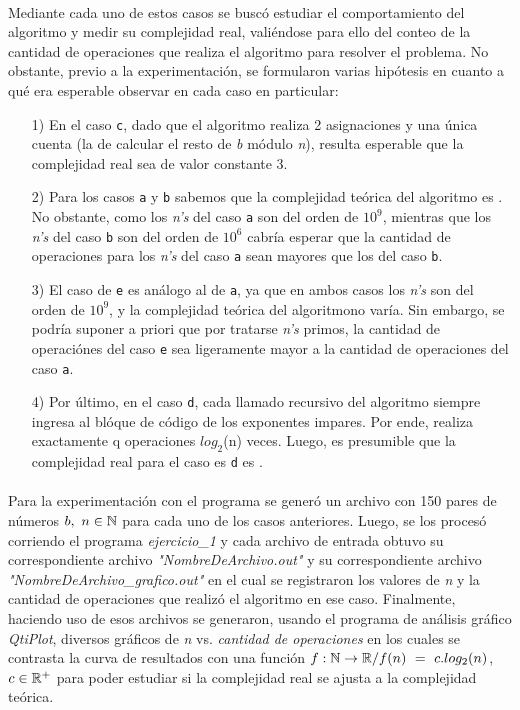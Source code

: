 \paragraph{}
Mediante cada uno de estos casos se buscó estudiar el comportamiento del algoritmo y medir su complejidad real, valiéndose para ello del conteo de la cantidad de operaciones que realiza el algoritmo para resolver el problema. No obstante, previo a la experimentación, se formularon varias hipótesis en cuanto a qué era esperable observar en cada caso en particular:
	\begin{itemize}
		\item[1)]{En el caso \texttt{c}, dado que el algoritmo realiza 2 asignaciones y una única cuenta (la de calcular el resto de \textit{b} módulo \textit{n}), resulta esperable que la complejidad real sea de valor constante 3.}
		\item[2)]{Para los casos \texttt{a} y \texttt{b} sabemos que la complejidad teórica del algoritmo es . No obstante, como los \textit{n's} del caso \texttt{a} son del orden de $10^9$, mientras que los \textit{n's} del caso \texttt{b} son del orden de $10^6$ cabría esperar que la cantidad de operaciones para los \textit{n's} del caso \texttt{a} sean mayores que los del caso \texttt{b}}. 
		\item[3)]{El caso de \texttt{e} es análogo al de \texttt{a}, ya que en ambos casos los \textit{n's} son del orden de $10^9$, y la complejidad teórica del algoritmono varía. Sin embargo, se podría suponer a priori que por tratarse \textit{n's} primos, la cantidad de operaciónes del caso \texttt{e} sea ligeramente mayor a la cantidad de operaciones del caso \texttt{a}.}
		\item[4)]{Por último, en el caso \texttt{d}, cada llamado recursivo del algoritmo siempre ingresa al blóque de código de los exponentes impares. Por ende, realiza exactamente q operaciones $log_2$(n) veces. Luego, es presumible que la complejidad real para el caso es \texttt{d} es .}
	\end{itemize}

\paragraph{}
Para la experimentación con el programa se generó un archivo con 150 pares de números $b,\ n \in \mathbb{N}$ para cada uno de los casos anteriores. Luego, se los procesó corriendo el programa \textit{ejercicio\_1} y cada archivo de entrada obtuvo su correspondiente archivo \textit{"NombreDeArchivo.out"} y su correspondiente archivo \textit{"NombreDeArchivo\_grafico.out"} en el cual se registraron los valores de \textit{n} y la cantidad de operaciones que realizó el algoritmo en ese caso. Finalmente, haciendo uso de esos archivos se generaron, usando el programa de análisis gráfico \textit{QtiPlot}, diversos gráficos de \textit{n} vs. \textit{cantidad de operaciones} en los cuales se contrasta la curva de resultados con una función $f: \mathbb{N} \rightarrow \mathbb{R} / f(n)\ =\ c.log_2(n)$, $c \in \mathbb{R}^+$ para poder estudiar si la complejidad real se ajusta a la complejidad teórica.\\

